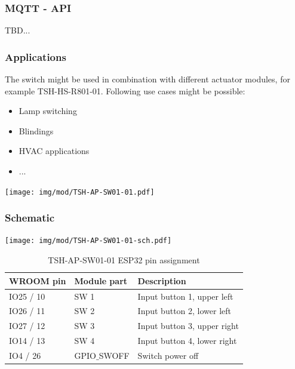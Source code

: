 \documentclass[]{scrreprt}%
\begin{document}
\subsubsection{MQTT - API}

TBD...
\newpage

\subsubsection{Applications}

The switch might be used in combination with different actuator modules, for example TSH-HS-R801-01.
Following use cases might be possible:
 
 \begin{itemize}
  \item Lamp switching
  \item Blindings
  \item HVAC applications
  \item ...
 \end{itemize}

\begin{center}
\texttt{[image: img/mod/TSH-AP-SW01-01.pdf]} 
\end{center}




\subsubsection{Schematic}
  
\texttt{[image: img/mod/TSH-AP-SW01-01-sch.pdf]}

\begin{table}[h!]
\centering
\label{TSH-AP-SW01-01-pins}
\begin{tabular}{|l|l|l|}
\hline
WROOM pin	& Module part 	& Description \\ \hline \hline
IO25 / 10	& SW 1		& Input button 1, upper left \\ \hline
IO26 / 11	& SW 2		& Input button 2, lower left \\ \hline
IO27 / 12	& SW 3		& Input button 3, upper right \\ \hline
IO14 / 13 	& SW 4		& Input button 4, lower right \\ \hline
IO4 / 26 	& GPIO$\_$SWOFF	& Switch power off \\ \hline
\end{tabular}
\caption{TSH-AP-SW01-01 ESP32 pin assignment}
\end{table}
 
\end{document}
